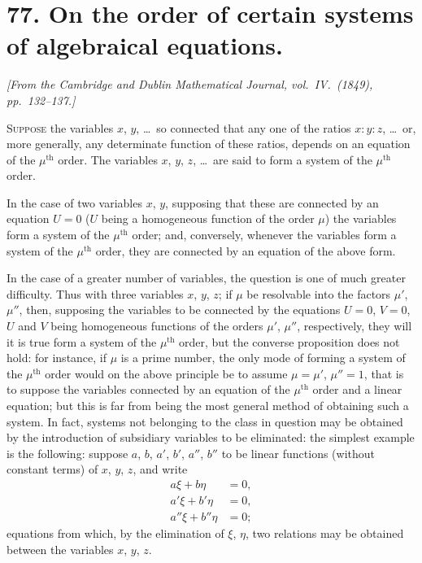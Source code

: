 \documentclass[11pt,a4paper]{article}
\theoremstyle{definition}
\begin{document}
\section*{77. On the order of certain systems of algebraical equations.}

\begin{flushright}
\textit{[From the Cambridge and Dublin Mathematical Journal, vol.\ IV.\ (1849), pp.\ 132--137.]}
\end{flushright}

\setcounter{page}{457}

\textsc{Suppose} the variables $x$, $y$, \ldots\ so connected that any one of the ratios $x : y : z$, \ldots\ or, more generally, any determinate function of these ratios, depends on an equation of the $\mu^{\text{th}}$ order. The variables $x$, $y$, $z$, \ldots\ are said to form a system of the $\mu^{\text{th}}$ order.

In the case of two variables $x$, $y$, supposing that these are connected by an equation $U = 0$ ($U$ being a homogeneous function of the order $\mu$) the variables form a system of the $\mu^{\text{th}}$ order; and, conversely, whenever the variables form a system of the $\mu^{\text{th}}$ order, they are connected by an equation of the above form.

In the case of a greater number of variables, the question is one of much greater difficulty. Thus with three variables $x$, $y$, $z$; if $\mu$ be resolvable into the factors $\mu'$, $\mu''$, then, supposing the variables to be connected by the equations $U = 0$, $V = 0$, $U$ and $V$ being homogeneous functions of the orders $\mu'$, $\mu''$, respectively, they will it is true form a system of the $\mu^{\text{th}}$ order, but the converse proposition does not hold: for instance, if $\mu$ is a prime number, the only mode of forming a system of the $\mu^{\text{th}}$ order would on the above principle be to assume $\mu = \mu'$, $\mu'' = 1$, that is to suppose the variables connected by an equation of the $\mu^{\text{th}}$ order and a linear equation; but this is far from being the most general method of obtaining such a system. In fact, systems not belonging to the class in question may be obtained by the introduction of subsidiary variables to be eliminated: the simplest example is the following: suppose $a$, $b$, $a'$, $b'$, $a''$, $b''$ to be linear functions (without constant terms) of $x$, $y$, $z$, and write
\begin{align*}
a\xi + b\eta &= 0, \\
a'\xi + b'\eta &= 0, \\
a''\xi + b''\eta &= 0;
\end{align*}
equations from which, by the elimination of $\xi$, $\eta$, two relations may be obtained between the variables $x$, $y$, $z$.
\end{document}
